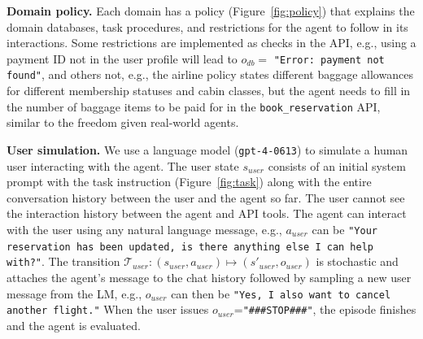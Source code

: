 \documentclass{article}
\begin{document}
\textbf{Domain policy.} Each domain has a policy (Figure~\ref{fig:policy}) that explains the domain databases, task procedures, and restrictions for the agent to follow in its interactions. Some restrictions are implemented as checks in the API, e.g., using a payment ID not in the user profile will lead to $o_{db}=$ \texttt{"Error: payment not found"}, and others not, e.g., the airline policy states different baggage allowances for different membership statuses and cabin classes, but the agent needs to fill in the number of baggage items to be paid for in the \texttt{book\_reservation} API, similar to the freedom given real-world agents.







\textbf{User simulation.} We use a language model (\texttt{gpt-4-0613}) to simulate a human user interacting with the agent. The user state $s_{user}$ consists of an initial system prompt with the task instruction (Figure~\ref{fig:task}) along with the entire conversation history between the user and the agent so far. The user cannot see the interaction history between the agent and API tools. The agent can interact with the user using any natural language message, e.g., $a_{user}$ can be \texttt{"Your reservation has been updated,\,is there anything else I can help with?"}. The transition $\mathcal{T}_{user}: (s_{user}, a_{user}) \mapsto (s'_{user}, o_{user})$ is stochastic and attaches the agent's message to the chat history followed by sampling a new user message from the LM, e.g., $o_{user}$ can then be \texttt{"Yes,\,I also want to cancel another flight."} When the user issues $o_{user}$=\texttt{"\#\#\#STOP\#\#\#"}, the episode finishes and the agent is evaluated. 
\end{document}
